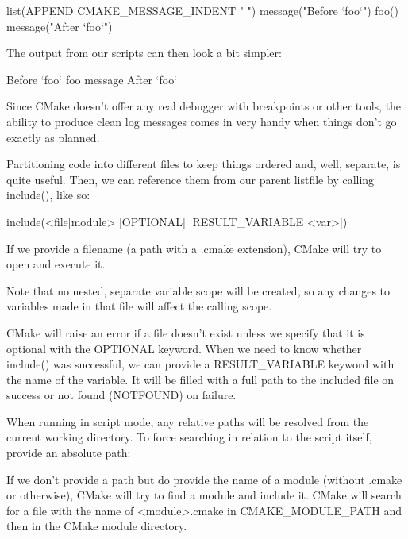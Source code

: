 \begin{cmake}
list(APPEND CMAKE_MESSAGE_INDENT " ")
message("Before `foo`")
foo()
message("After `foo`")
\end{cmake}

The output from our scripts can then look a bit simpler:

\begin{shell}
Before `foo`
    foo message
After `foo`
\end{shell}

Since CMake doesn’t offer any real debugger with breakpoints or other tools, the ability to produce clean log messages comes in very handy when things don’t go exactly as planned.


Partitioning code into different files to keep things ordered and, well, separate, is quite useful. Then, we can reference them from our parent listfile by calling include(), like so:

\begin{shell}
include(<file|module> [OPTIONAL] [RESULT_VARIABLE <var>])
\end{shell}

If we provide a filename (a path with a .cmake extension), CMake will try to open and execute it.

Note that no nested, separate variable scope will be created, so any changes to variables made in that file will affect the calling scope.

CMake will raise an error if a file doesn’t exist unless we specify that it is optional with the OPTIONAL keyword. When we need to know whether include() was successful, we can provide a RESULT\_VARIABLE keyword with the name of the variable. It will be filled with a full path to the included file on success or not found (NOTFOUND) on failure.

When running in script mode, any relative paths will be resolved from the current working directory. To force searching in relation to the script itself, provide an absolute path:


If we don’t provide a path but do provide the name of a module (without .cmake or otherwise), CMake will try to find a module and include it. CMake will search for a file with the name of <module>.cmake in CMAKE\_MODULE\_PATH and then in the CMake module directory.


